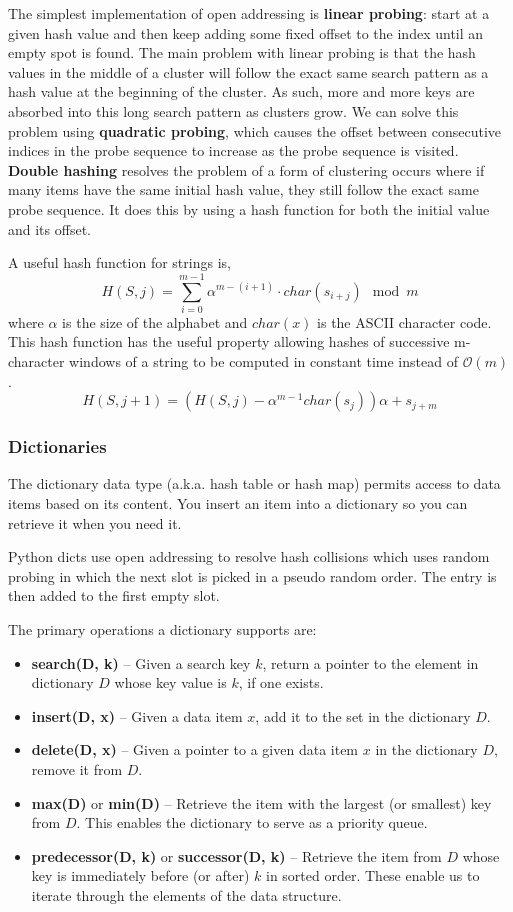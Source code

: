 \documentclass{article}
\newcommand{\bigO}{\mathcal{O}}
\begin{document}
    The simplest implementation of open addressing is \textbf{linear probing}: start at a given hash value and then keep adding some fixed offset to the index until an empty spot is found. The main problem with linear probing is that the hash values in the middle of a cluster will follow the exact same search pattern as a hash value at the beginning of the cluster. As such, more and more keys are absorbed into this long search pattern as clusters grow. We can solve this problem using \textbf{quadratic probing}, which causes the offset between consecutive indices in the probe sequence to increase as the probe sequence is visited. \textbf{Double hashing} resolves the problem of a form of clustering occurs where if many items have the same initial hash value, they still follow the exact same probe sequence. It does this by using a hash function for both the initial value and its offset.

    A useful hash function for strings is,
    \[
        H(S,j) = \sum_{i=0}^{m-1} \alpha^{m-(i+1)} \cdot char(s_{i+j}) \mod m
    \]
    where $\alpha$ is the size of the alphabet and $char(x)$ is the ASCII character code. This hash function has the useful property allowing hashes of successive m-character windows of a string to be computed in constant time instead of $\bigO(m)$.
    \[
        H(S, j+1) = (H(S,j) - \alpha^{m-1}char(s_j))\alpha + s_{j+m}
    \]
    
    \subsubsection{Dictionaries}
    The dictionary data type (a.k.a. hash table or hash map) permits access to data items based on its content. You insert an item into a dictionary so you can retrieve it when you need it.
    
    Python dicts use open addressing to resolve hash collisions which uses random probing in which the next slot is picked in a pseudo random order. The entry is then added to the first empty slot.
    
    The primary operations a dictionary supports are:
    \begin{itemize}
        \item  \textbf{search(D, k)} – Given a search key $k$, return a pointer to the element in dictionary $D$ whose key value is $k$, if one exists.
        \item \textbf{insert(D, x)} – Given a data item $x$, add it to the set in the dictionary $D$.
        \item \textbf{delete(D, x)} – Given a pointer to a given data item $x$ in the dictionary $D$, remove it from $D$.
        \item \textbf{max(D)} or \textbf{min(D)} – Retrieve the item with the largest (or smallest) key from $D$. This enables the dictionary to serve as a priority queue.
        \item \textbf{predecessor(D, k)} or \textbf{successor(D, k)} – Retrieve the item from $D$ whose key is immediately before (or after) $k$ in sorted order. These enable us to iterate through the elements of the data structure.
    \end{itemize}
    
\end{document}
